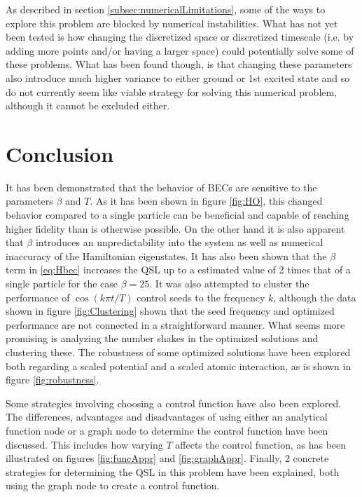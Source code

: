 \documentclass[aps,pra,reprint,superscriptaddress]{revtex4-1}
\begin{document}
As described in section \ref{subsec:numericalLimitations}, some of the ways to explore this problem are blocked by numerical instabilities. What has not yet been tested is how changing the discretized space or discretized timescale (i.e. by adding more points and/or having a larger space) could potentially solve some of these problems. What has been found though, is that changing these parameters also introduce much higher variance to either ground or 1st excited state and so do not currently seem like viable strategy for solving this numerical problem, although it cannot be excluded either.


\section{\label{sec:conclusion}Conclusion}
It has been demonstrated that the behavior of BECs are sensitive to the parameters $\beta$ and $T$. As it has been shown in figure \ref{fig:HO}, this changed behavior compared to a single particle can be beneficial and capable of reaching higher fidelity than is otherwise possible. On the other hand it is also apparent that $\beta$ introduces an unpredictability into the system as well as numerical inaccuracy of the Hamiltonian eigenstates. It has also been shown that the $\beta$ term in \eqref{eq:Hbec} increases the QSL up to a estimated value of 2 times that of a single particle for the case $\beta=25$. It was also attempted to cluster the performance of $\cos(k\pi t/T)$ control seeds to the frequency $k$, although the data shown in figure \ref{fig:Clustering} shown that the seed frequency and optimized performance are not connected in a straightforward manner. What seems more promising is analyzing the number shakes in the optimized solutions and clustering these. The robustness of some optimized solutions have been explored both regarding a scaled potential and a scaled atomic interaction, as is shown in figure \ref{fig:robustness}.

Some strategies involving choosing a control function have also been explored. The differences, advantages and disadvantages of using either an analytical function node or a graph node to determine the control function have been discussed. This includes how varying $T$ affects the control function, as has been illustrated on figures \ref{fig:funcAppr} and \ref{fig:graphAppr}. Finally, 2 concrete strategies for determining the QSL in this problem have been explained, both using the graph node to create a control function. 
\end{document}
